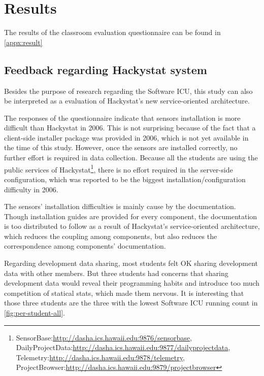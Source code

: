 \chapter {Results}

The results of the classroom evaluation questionnaire can be found in \autoref{appx:result}

\section {Feedback regarding Hackystat system}
Besides the purpose of research regarding the Software ICU, this study can also be interpreted as a evaluation of Hackystat's new service-oriented architecture.

The responses of the questionnaire indicate that sensors installation is more difficult than Hackystat in 2006. This is not surprising because of the fact that a client-side installer package was provided in 2006, which is not yet available in the time of this study. However, once the sensors are installed correctly, no further effort is required in data collection. Because all the students are using the public services of Hackystat\footnote{SensorBase:\url{http://dasha.ics.hawaii.edu:9876/sensorbase},\\ DailyProjectData:\url{http://dasha.ics.hawaii.edu:9877/dailyprojectdata},\\ Telemetry:\url{http://dasha.ics.hawaii.edu:9878/telemetry},\\ ProjectBrowser:\url{http://dasha.ics.hawaii.edu:9879/projectbrowser}}, there is no effort required in the server-side configuration, which was reported to be the biggest installation/configuration difficulty in 2006.

The sensors' installation difficulties is mainly cause by the documentation. Though installation guides are provided for every component, the documentation is too distributed to follow as a result of Hackystat's service-oriented architecture, which reduces the coupling among components, but also reduces the correspondence among components' documentation.

Regarding development data sharing, most students felt OK sharing development data with other members. But three students had concerns that sharing development data would reveal their programming habits and introduce too much competition of statical stats, which made them nervous. It is interesting that those three students are the three with the lowest Software ICU running count in \autoref{fig:per-student-all}. %

